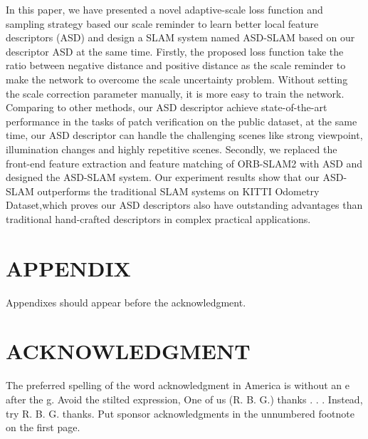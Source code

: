 \documentclass[letterpaper, 10 pt, conference]{ieeeconf}  %
\begin{document}
In this paper, we have presented a novel adaptive-scale loss function and  sampling strategy based our scale reminder to learn better local feature descriptors (ASD) and design a SLAM system named ASD-SLAM based on our descriptor ASD at the same time. Firstly, the proposed loss function take  the ratio between  negative distance and positive distance as the scale reminder to make the network to overcome the scale uncertainty problem. Without setting the scale correction parameter manually, it is more easy to train the network. Comparing to other methods, our ASD descriptor achieve state-of-the-art performance in the tasks of patch verification on the public dataset, at the same time, our ASD descriptor can handle the challenging scenes like strong viewpoint, illumination changes and highly repetitive scenes. Secondly, we replaced the front-end feature extraction and feature matching of ORB-SLAM2 with ASD and designed the ASD-SLAM system. Our experiment results show that our ASD-SLAM outperforms the traditional SLAM systems on KITTI Odometry Dataset,which proves our ASD descriptors also have outstanding advantages than traditional hand-crafted descriptors in complex practical applications.









\section*{APPENDIX}

Appendixes should appear before the acknowledgment.

\section*{ACKNOWLEDGMENT}

The preferred spelling of the word acknowledgment in America is without an e after the g. Avoid the stilted expression, One of us (R. B. G.) thanks . . .  Instead, try R. B. G. thanks. Put sponsor acknowledgments in the unnumbered footnote on the first page.



\end{document}
